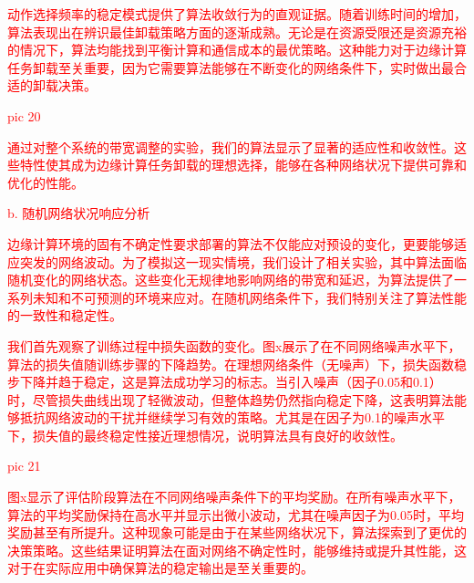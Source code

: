 \documentclass[preprint,12pt]{elsarticle}
\begin{document}
\textcolor{red}{动作选择频率的稳定模式提供了算法收敛行为的直观证据。随着训练时间的增加，算法表现出在辨识最佳卸载策略方面的逐渐成熟。无论是在资源受限还是资源充裕的情况下，算法均能找到平衡计算和通信成本的最优策略。这种能力对于边缘计算任务卸载至关重要，因为它需要算法能够在不断变化的网络条件下，实时做出最合适的卸载决策。}

\textcolor{red}{pic 20}

\textcolor{red}{通过对整个系统的带宽调整的实验，我们的算法显示了显著的适应性和收敛性。这些特性使其成为边缘计算任务卸载的理想选择，能够在各种网络状况下提供可靠和优化的性能。}

\textcolor{red}{b. 随机网络状况响应分析}

\textcolor{red}{边缘计算环境的固有不确定性要求部署的算法不仅能应对预设的变化，更要能够适应突发的网络波动。为了模拟这一现实情境，我们设计了相关实验，其中算法面临随机变化的网络状态。这些变化无规律地影响网络的带宽和延迟，为算法提供了一系列未知和不可预测的环境来应对。在随机网络条件下，我们特别关注了算法性能的一致性和稳定性。}

\textcolor{red}{我们首先观察了训练过程中损失函数的变化。图x展示了在不同网络噪声水平下，算法的损失值随训练步骤的下降趋势。在理想网络条件（无噪声）下，损失函数稳步下降并趋于稳定，这是算法成功学习的标志。当引入噪声（因子0.05和0.1）时，尽管损失曲线出现了轻微波动，但整体趋势仍然指向稳定下降，这表明算法能够抵抗网络波动的干扰并继续学习有效的策略。尤其是在因子为0.1的噪声水平下，损失值的最终稳定性接近理想情况，说明算法具有良好的收敛性。}

\textcolor{red}{pic 21}

\textcolor{red}{图x显示了评估阶段算法在不同网络噪声条件下的平均奖励。在所有噪声水平下，算法的平均奖励保持在高水平并显示出微小波动，尤其在噪声因子为0.05时，平均奖励甚至有所提升。这种现象可能是由于在某些网络状况下，算法探索到了更优的决策策略。这些结果证明算法在面对网络不确定性时，能够维持或提升其性能，这对于在实际应用中确保算法的稳定输出是至关重要的。}




\end{document}
